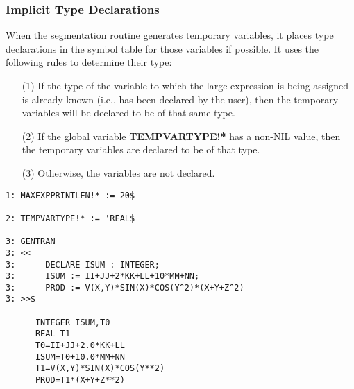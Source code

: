 \subsubsection{Implicit Type Declarations}\label{GENTRAN:itd}
When the segmentation routine generates temporary variables, it places
type declarations in the symbol table for those variables if
possible.  It uses the following rules to determine their type:
 
\begin{itemize}
\item[{(1)}]
If the type of the variable to which the large expression is being
assigned is already known (i.e., has been declared by the user),
then the temporary variables will be declared to be of that same type.
\item[{(2)}] 
If the global variable {\bf TEMPVARTYPE!*} has a non-NIL value, then the
temporary variables are declared to be of that type.
\item[{(3)}]
Otherwise, the variables are not declared.
\end{itemize}

\newpage
\begin{describe}{\example} 

\begin{verbatim}
1: MAXEXPPRINTLEN!* := 20$

2: TEMPVARTYPE!* := 'REAL$

3: GENTRAN
3: <<
3:      DECLARE ISUM : INTEGER;
3:      ISUM := II+JJ+2*KK+LL+10*MM+NN;
3:      PROD := V(X,Y)*SIN(X)*COS(Y^2)*(X+Y+Z^2)
3: >>$

      INTEGER ISUM,T0
      REAL T1
      T0=II+JJ+2.0*KK+LL
      ISUM=T0+10.0*MM+NN
      T1=V(X,Y)*SIN(X)*COS(Y**2)
      PROD=T1*(X+Y+Z**2)
\end{verbatim}
\end{describe}
